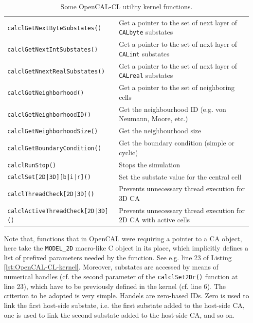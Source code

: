 \begin{table}
\begin{footnotesize}
\begin{tabular}{l|l}
    \verb'calclGetNextByteSubstates()'    & Get a pointer to the set of next layer of \verb'CALbyte' substates \\
    \verb'calclGetNextIntSubstates()'     & Get a pointer to the set of next layer of \verb'CALint' substates \\
    \verb'calclGetNnextRealSubstates()'   & Get a pointer to the set of next layer of \verb'CALreal' substates \\
    \verb'calclGetNeighborhood()'         & Get a pointer to the set of neighboring cells \\
    \verb'calclGetNeighborhoodID()'       & Get the neighbourhood ID (e.g. von Neumann, Moore, etc.) \\
    \verb'calclGetNeighborhoodSize()'     & Get the neighbourhood size \\
    \verb'calclGetBoundaryCondition()'    & Get the boundary condition (simple or cyclic) \\
    \verb'calclRunStop()'                 & Stops the simulation \\
    \verb'calclSet[2D|3D][b|i|r]()'       & Set the substate value for the central cell\\
    \verb'calclThreadCheck[2D|3D]()'      & Prevents unnecessary thread execution for 3D CA\\
    \verb'calclActiveThreadCheck[2D|3D]()'& Prevents unnecessary thread execution for 2D CA with active cells\\
    \hline
    \end{tabular}
    \end{footnotesize}
  \caption{Some OpenCAL-CL utility kernel functions.}
  \label{tab:kernel-utility-function}
\end{table}

Note that, functions that in OpenCAL were requiring a pointer to a CA
object, here take the \verb'MODEL_2D' macro-like C object in its
place, which implicitly defines a list of prefixed parameters needed
by the function. See e.g. line 23 of Listing
\ref{lst:OpenCAL-CL-kernel}. Moreover, substates are accessed by means
of numerical handles (cf. the second parameter of the
\verb'calclSet2Dr()' function at line 23), which have to be previously
defined in the kernel (cf. line 6). The criterion to be adopted
is very simple. Handels are zero-based IDs. Zero is used to link the
first host-side substate, i.e. the first substate added to the
host-side CA, one is used to link the second substate added to the
host-side CA, and so on.

